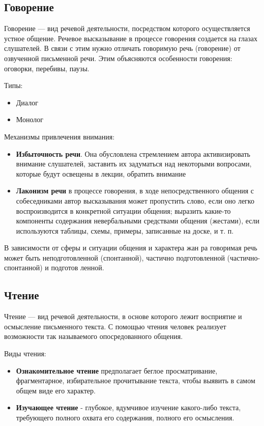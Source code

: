 \subsection{Говорение}
Говорение — вид речевой деятельности, посредством которого
осуществляется устное общение. Речевое высказывание в процессе говорения создается на глазах слушателей. В связи с этим нужно отличать говоримую
речь (говорение) от озвученной письменной речи. Этим объясняются особенности говорения: оговорки, перебивы, паузы.

Типы:
\begin{itemize}
	\item Диалог
	\item Монолог
\end{itemize}


Механизмы привлечения внимания:
\begin{itemize}
	\item \textbf{Избыточность речи}. Она обусловлена стремлением автора активизировать внимание слушателей, заставить их задуматься над некоторыми вопросами, которые будут освещены в лекции, обратить внимание
	\item \textbf{Лаконизм речи} в процессе говорения, в ходе непосредственного общения с собеседниками автор высказывания может пропустить слово, если оно легко воспроизводится в конкретной ситуации общения; выразить какие-то компоненты содержания невербальными средствами общения (жестами), если используются
	таблицы, схемы, примеры, записанные на доске, и т. п.
\end{itemize}

В зависимости от сферы и ситуации общения и характера жан­
ра говоримая речь может быть неподготовленной (спонтанной),
частично подготовленной (частично-спонтанной) и подготов­
ленной.
\subsection{Чтение}
Чтение — вид речевой деятельности, в основе которого лежит восприятие и осмысление письменного текста. С помощью чтения человек реализует возможности так называемого
опосредованного общения.

Виды чтения:
\begin{itemize}
	\item \textbf{Ознакомительное чтение} предполагает беглое просматривание,
	фрагментарное, избирательное прочитывание текста, чтобы выявить в самом общем виде его характер.
	\item \textbf{Изучающее чтение} - глубокое, вдумчивое изучение какого-либо текста, требующего полного охвата его содержания, полного его осмысления. 
\end{itemize}

